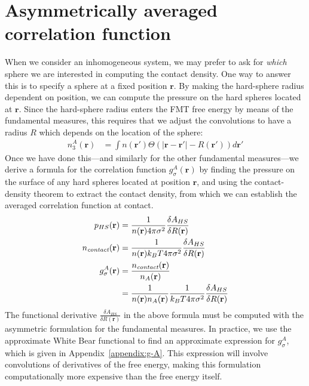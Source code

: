 \documentclass[letterpaper,twocolumn,amsmath,amssymb,jcp,10pt,aip]{revtex4-1}
\newcommand{\rr}{\textbf{r}}
\begin{document}
\section{Asymmetrically averaged correlation function}\label{sec:g-A}

When we consider an inhomogeneous system, we may prefer to ask for
\emph{which} sphere we are interested in computing the contact
density.  One way to answer this is to specify a sphere at a fixed
position $\mathbf{r}$.  By making the hard-sphere radius dependent on
position, we can compute the pressure on the hard spheres located at
$\mathbf{r}$.  Since the hard-sphere radius enters the FMT free energy
by means of the fundamental measures, this requires that we adjust the
convolutions to have a radius $R$ which depends on the location of the
sphere:
\begin{align}
  n_3^A(\rr) &= \int n(\rr')\Theta(|\rr-\rr'|-R(\rr'))d\rr' \label{eq:n3A}
\end{align}
Once we have done this---and similarly for the other fundamental
measures---we derive a formula for the correlation function
$g_\sigma^A(\rr)$ by finding the pressure on the surface of any hard
spheres located at position $\rr$, and using the contact-density
theorem to extract the contact density, from which we can establish
the averaged correlation function at contact.
\begin{align}
  p_{HS}(\mathbf{r}) &= \frac{1}{n(\rr) 4\pi \sigma^2} \frac{\delta
    A_{HS}}{\delta R(\mathbf{r})} \label{eq:p_{HS}^A}\\
  \ncontact(\rr) &= \frac{1}{n(\rr) k_BT 4\pi \sigma^2} \frac{\delta
    A_{HS}}{\delta R(\mathbf{r})} \\
  g_\sigma^A(\rr) &= \frac{\ncontact(\rr)}{n_A(\rr)} \\
  &= \frac{1}{n(\rr) n_A(\rr)}\frac{1}{ k_BT 4\pi \sigma^2} \frac{\delta
    A_{HS}}{\delta R(\mathbf{r})} \label{eq:g-A-exact}
\end{align}
The functional derivative $\frac{\delta A_{HS}}{\delta R(\mathbf{r})}$
in the above formula must be computed with the asymmetric formulation
for the fundamental measures.  In practice, we use the approximate
White Bear functional to find an approximate expression for
$g_\sigma^A$, which is given in Appendix~\ref{appendix:g-A}.  This
expression will involve convolutions of derivatives of the free
energy, making this formulation computationally more expensive than
the free energy itself.
\end{document}
